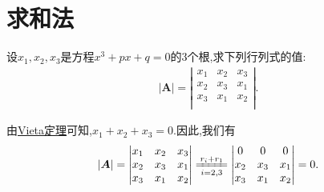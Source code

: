 \documentclass[../../main.tex]{subfiles}%
\begin{document}
\section{求和法}

\begin{example}
设$x_1,x_2,x_3$是方程$x^3+px+q=0$的3个根,求下列行列式的值:
\begin{gather}
\left| \boldsymbol{A} \right|=\left| \begin{matrix}
x_1&		x_2&		x_3\\
x_2&		x_3&		x_1\\
x_3&		x_1&		x_2\\
\end{matrix} \right|.
\nonumber
\end{gather}
\end{example}
\begin{solution}

由\hyperref[theorem:Vieta定理]{Vieta定理}可知,$x_1+x_2+x_3=0$.因此,我们有
\begin{equation}
\begin{split}
\left| \boldsymbol{A} \right|=\left| \begin{matrix}
x_1&		x_2&		x_3\\
x_2&		x_3&		x_1\\
x_3&		x_1&		x_2\\
\end{matrix} \right|\xlongequal[i=2,3]{r_i+r_1}\left| \begin{matrix}
0&		0&		0\\
x_2&		x_3&		x_1\\
x_3&		x_1&		x_2\\
\end{matrix} \right|=0.
\end{split}
\nonumber
\end{equation}

\end{solution}
\end{document}
